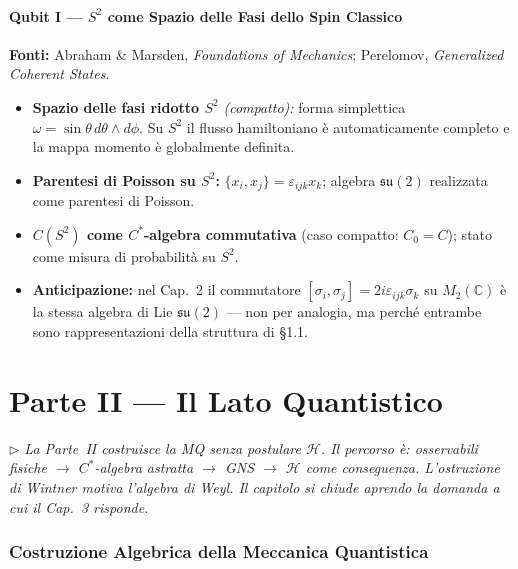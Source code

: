 \documentclass[12pt, a4paper]{article}
\newcommand{\fonti}[1]{%
	\begin{fontebox}
		\textcolor{fontecolor}{\footnotesize\textbf{Fonti:} #1}
	\end{fontebox}%
}
\newcommand{\nota}[1]{%
	\par\smallskip
	\noindent\textit{\small $\triangleright$\; #1}
	\par\smallskip
}
\begin{document}
	\subsection{Qubit I --- $S^2$ come Spazio delle Fasi dello Spin Classico}
	
	\fonti{Abraham \& Marsden, \textit{Foundations of Mechanics};
		Perelomov, \textit{Generalized Coherent States}.}
	
	\begin{itemize}
		\item \textbf{Spazio delle fasi ridotto $S^2$} \emph{(compatto):} forma simplettica
		$\omega=\sin\theta\,d\theta\wedge d\phi$. Su $S^2$ il flusso hamiltoniano è
		automaticamente completo e la mappa momento è globalmente definita.
		\item \textbf{Parentesi di Poisson su $S^2$:} $\{x_i,x_j\}=\varepsilon_{ijk}x_k$;
		algebra $\mathfrak{su}(2)$ realizzata come parentesi di Poisson.
		\item \textbf{$C(S^2)$ come $C^*$-algebra commutativa} (caso compatto: $C_0=C$);
		stato come misura di probabilità su $S^2$.
		\item \textbf{Anticipazione:} nel Cap.~2 il commutatore $[\sigma_i,\sigma_j]=
		2i\varepsilon_{ijk}\sigma_k$ su $M_2(\mathbb{C})$ è la stessa algebra di Lie
		$\mathfrak{su}(2)$ --- non per analogia, ma perché entrambe sono rappresentazioni
		della struttura di \S1.1.
	\end{itemize}
	
	\newpage
	\part*{Parte II --- Il Lato Quantistico}
	
	\nota{La Parte~II costruisce la MQ senza postulare $\mathcal{H}$. Il percorso è:
		osservabili fisiche $\to$ $C^*$-algebra astratta $\to$ GNS $\to$ $\mathcal{H}$
		come conseguenza. L'ostruzione di Wintner motiva l'algebra di Weyl. Il capitolo
		si chiude aprendo la domanda a cui il Cap.~3 risponde.}
	
	\section{Costruzione Algebrica della Meccanica Quantistica}
	
\end{document}
